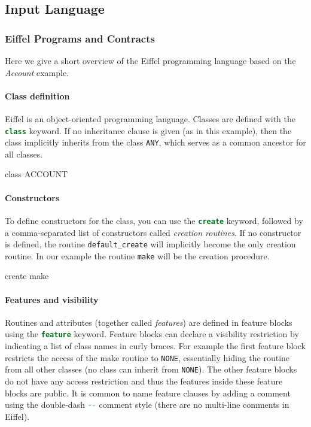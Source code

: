 \documentclass[a4paper,12pt]{article}
\newcommand{\e}[1]{\mbox{\lstinline[language=Eiffel]|#1|}}
\begin{document}
\subsection{Input Language}

\subsubsection*{Eiffel Programs and Contracts}

Here we give a short overview of the Eiffel programming language based on the \emph{Account} example.

\paragraph{Class definition}

Eiffel is an object-oriented programming language. Classes are defined with the \e{class} keyword. If no inheritance clause is given (as in this example), then the class implicitly inherits from the class \e{ANY}, which serves as a common ancestor for all classes.

\begin{erunning}
class
	ACCOUNT
\end{erunning}

\paragraph{Constructors}

To define constructors for the class, you can use the \e{create} keyword, followed by a comma-separated list of constructors called \emph{creation routines}. If no constructor is defined, the routine \e{default_create} will implicitly become the only creation routine. In our example the routine \e{make} will be the creation procedure.

\begin{erunning}
create
	make
\end{erunning}

\paragraph{Features and visibility}

Routines and attributes (together called \emph{features}) are defined in feature blocks using the \e{feature} keyword. Feature blocks can declare a visibility restriction by indicating a list of class names in curly braces. For example the first feature block restricts the access of the make routine to \e{NONE}, essentially hiding the routine from all other classes (no class can inherit from \e{NONE}). The other feature blocks do not have any access restriction and thus the features inside these feature blocks are public. It is common to name feature clauses by adding a comment using the double-dash \e{--} comment style (there are no multi-line comments in Eiffel).
\end{document}
